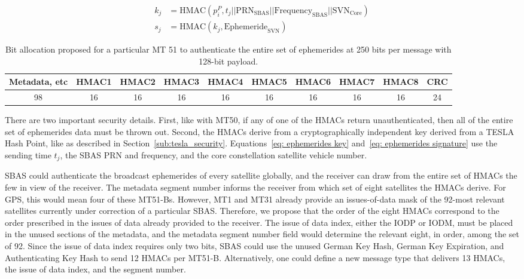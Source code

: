 \documentclass[letterpaper,times]{IONconf/IONconf}
\begin{document}
		\begin{align}
			k_j &= \textrm{HMAC}(p^P_i, t_j || \textrm{PRN}_\textrm{SBAS} || \textrm{Frequency}_\textrm{SBAS} || \textrm{SVN}_\textrm{Core} \label{eq: ephemerides key}) \\
			s_j &= \textrm{HMAC}(k_j, \textrm{Ephemeride}_{\textrm{SVN}}) \label{eq: ephemerides signature}
		\end{align}

		\begin{table}
			\center
			\begin{tabular}{|c|c|c|c|c|c|c|c|c|c|} \hline
				Metadata, etc & HMAC1 & HMAC2 & HMAC3 & HMAC4 & HMAC5 & HMAC6 & HMAC7 & HMAC8 & CRC \\ \hline
				98 & 16 & 16 & 16 & 16& 16 & 16 & 16 & 16 & 24 \\ \hline
			\end{tabular}
			\caption{Bit allocation proposed for a particular MT 51 to authenticate the entire set of ephemerides at 250 bits per message with 128-bit payload.}
			\label{tab: nma}
		\end{table}

		There are two important security details.
		First, like with MT50, if any of one of the HMACs return unauthenticated, then all of the entire set of ephemerides data must be thrown out.
		Second, the HMACs derive from a cryptographically independent key derived from a TESLA Hash Point, like as described in Section~\ref{sub:tesla_security}.
		Equations~\eqref{eq: ephemerides key} and~\eqref{eq: ephemerides signature} use the sending time $t_j$, the SBAS PRN and frequency, and the core constellation satellite vehicle number.

		SBAS could authenticate the broadcast ephemerides of every satellite globally, and the receiver can draw from the entire set of HMACs the few in view of the receiver.
		The metadata segment number informs the receiver from which set of eight satellites the HMACs derive.
		For GPS, this would mean four of these MT51-Bs.
		However, MT1 and MT31 already provide an issues-of-data mask of the 92-most relevant satellites currently under correction of a particular SBAS.
		Therefore, we propose that the order of the eight HMACs correspond to the order prescribed in the issues of data already provided to the receiver.
		The issue of data index, either the IODP or IODM, must be placed in the unused sections of the metadata, and the metadata segment number field would determine the relevant eight, in order, among the set of 92.
		Since the issue of data index requires only two bits, SBAS could use the unused German Key Hash, German Key Expiration, and Authenticating Key Hash to send 12 HMACs per MT51-B.
		Alternatively, one could define a new message type that delivers 13 HMACs, the issue of data index, and the segment number.
\end{document}
